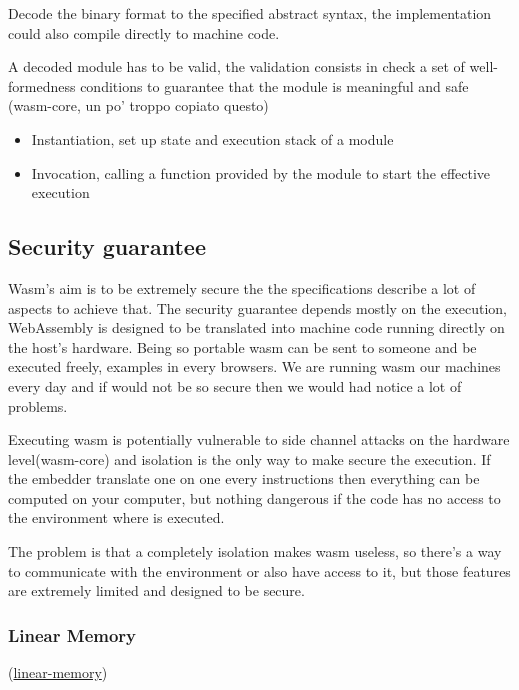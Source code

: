 \documentclass[../main.tex]{subfiles}
\begin{document}
\begin{description} [style=nextline]
  \item[Decoding]
        Decode the binary format to the specified abstract syntax, the implementation could also compile directly to machine code.
  \item[Validation]
        A decoded module has to be valid, the validation consists in check a set of well-formedness conditions to guarantee that the module is meaningful and safe (wasm-core, un po' troppo copiato questo)
  \item[Execution]
        \begin{itemize}
          \item Instantiation, set up state and execution stack of a module
          \item Invocation, calling a function provided by the module to start the effective execution
        \end{itemize}
\end{description}

\subsection{Security guarantee}

Wasm's aim is to be extremely secure the the specifications describe a lot of aspects to achieve that. The security guarantee depends mostly on the execution, WebAssembly is designed to be translated into machine code running directly on the host’s hardware. Being so portable wasm can be sent to someone and be executed freely, examples in every browsers. We are running wasm our machines every day and if would not be so secure then we would had notice a lot of problems.

Executing wasm is potentially vulnerable to side channel attacks on the hardware level(wasm-core) and isolation is the only way to make secure the execution. If the embedder translate one on one every instructions then everything can be computed on your computer, but nothing dangerous if the code has no access to the environment where is executed.

The problem is that a completely isolation makes wasm useless, so there's a way to communicate with the environment or also have access to it, but those features are extremely limited and designed to be secure.

\subsubsection{Linear Memory}
(\href{https://hacks.mozilla.org/2017/07/memory-in-webassembly-and-why-its-safer-than-you-think/}{linear-memory})
\end{document}
